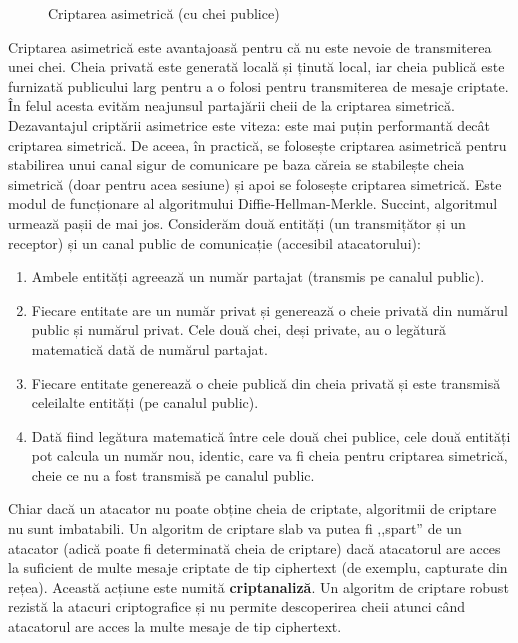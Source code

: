 \begin{figure}[htbp]
  \centering
  \def\svgwidth{\columnwidth}
  
  \caption{Criptarea asimetrică (cu chei publice)}
  \label{fig:sec:asymmetric-encryption}
\end{figure}

Criptarea asimetrică este avantajoasă pentru că nu este nevoie de transmiterea unei chei. Cheia privată este generată locală și ținută local, iar cheia publică este furnizată publicului larg pentru a o folosi pentru transmiterea de mesaje criptate. În felul acesta evităm neajunsul partajării cheii de la criptarea simetrică. Dezavantajul criptării asimetrice este viteza: este mai puțin performantă decât criptarea simetrică. De aceea, în practică, se folosește criptarea asimetrică pentru stabilirea unui canal sigur de comunicare pe baza căreia se stabilește cheia simetrică (doar pentru acea sesiune) și apoi se folosește criptarea simetrică. Este modul de funcționare al algoritmului Diffie-Hellman-Merkle. Succint, algoritmul urmează pașii de mai jos. Considerăm două entități (un transmițător și un receptor) și un canal public de comunicație (accesibil atacatorului):

\begin{enumerate}
  \item Ambele entități agreează un număr partajat (transmis pe canalul public).
  \item Fiecare entitate are un număr privat și generează o cheie privată din numărul public și numărul privat. Cele două chei, deși private, au o legătură matematică dată de numărul partajat.
  \item Fiecare entitate generează o cheie publică din cheia privată și este transmisă celeilalte entități (pe canalul public).
  \item Dată fiind legătura matematică între cele două chei publice, cele două entități pot calcula un număr nou, identic, care va fi cheia pentru criptarea simetrică, cheie ce nu a fost transmisă pe canalul public.
\end{enumerate}

Chiar dacă un atacator nu poate obține cheia de criptate, algoritmii de criptare nu sunt imbatabili. Un algoritm de criptare slab va putea fi ,,spart'' de un atacator (adică poate fi determinată cheia de criptare) dacă atacatorul are acces la suficient de multe mesaje criptate de tip ciphertext (de exemplu, capturate din rețea). Această acțiune este numită \textbf{criptanaliză}. Un algoritm de criptare robust rezistă la atacuri criptografice și nu permite descoperirea cheii atunci când atacatorul are acces la multe mesaje de tip ciphertext.

